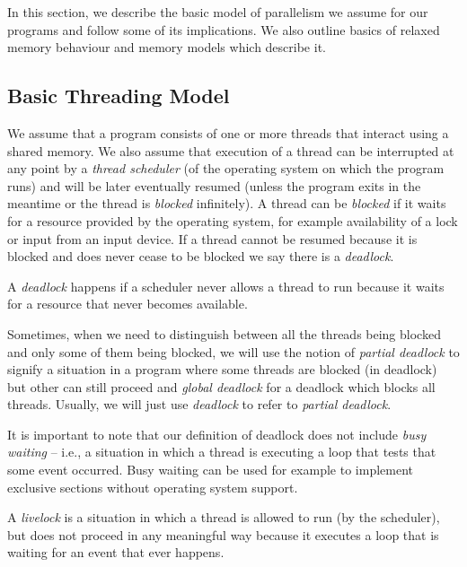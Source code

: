 In this section, we describe the basic model of parallelism we assume for our
programs and follow some of its implications.
We also outline basics of relaxed memory behaviour and memory models
which describe it.

\subsection{Basic Threading Model}

We assume that a program consists of one or more threads that interact using a
shared memory.
We also assume that execution of a thread can be interrupted at any point by a
\emph{thread scheduler} (of the operating system on which the program runs) and
will be later eventually resumed (unless the program exits in the meantime or
the thread is \emph{blocked} infinitely).
A thread can be \emph{blocked} if it waits for a resource provided by the
operating system, for example availability of a lock or input from an input
device.
If a thread cannot be resumed because it is blocked and does never cease to be
blocked we say there is a \emph{deadlock}.

\begin{definition}\label{def:deadlock}
    A \emph{deadlock} happens if a scheduler never allows a thread to run
    because it waits for a resource that never becomes available.

    Sometimes, when we need to distinguish between all the threads being
    blocked and only some of them being blocked, we will use the notion of
    \emph{partial deadlock} to signify a situation in a program where some
    threads are blocked (in deadlock) but other can still proceed and
    \emph{global deadlock} for a deadlock which blocks all threads.
    Usually, we will just use \emph{deadlock} to refer to \emph{partial deadlock}.
\end{definition}

It is important to note that our definition of deadlock does not include
\emph{busy waiting} -- i.e., a situation in which a thread is executing a loop
that tests that some event occurred.
Busy waiting can be used for example to implement exclusive sections without
operating system support.

\begin{definition}[Livelock]\label{def:livelock}
    A \emph{livelock} is a situation in which a thread is allowed to run (by
    the scheduler), but does not proceed in any meaningful way because it
    executes a loop that is waiting for an event that ever happens.
\end{definition}

